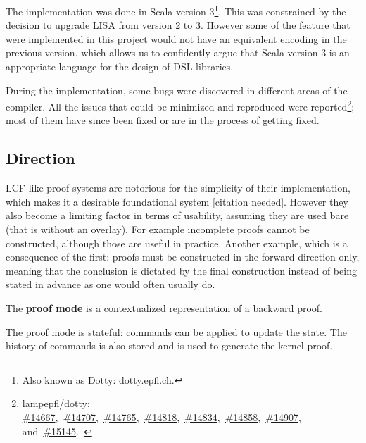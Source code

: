 The implementation was done in Scala version 3\footnote{Also known as Dotty: \href{https://dotty.epfl.ch}{dotty.epfl.ch}.}. This was constrained by the decision to upgrade LISA from version 2 to 3. However some of the feature that were implemented in this project would not have an equivalent encoding in the previous version, which allows us to confidently argue that Scala version 3 is an appropriate language for the design of DSL libraries.

During the implementation, some bugs were discovered in different areas of the compiler. All the issues that could be minimized and reproduced were reported\footnote{
lampepfl/dotty:
\href{https://github.com/lampepfl/dotty/issues/14667}{\#14667},\
\href{https://github.com/lampepfl/dotty/issues/14707}{\#14707},\
\href{https://github.com/lampepfl/dotty/issues/14765}{\#14765},\
\href{https://github.com/lampepfl/dotty/issues/14818}{\#14818},\
\href{https://github.com/lampepfl/dotty/issues/14834}{\#14834},\
\href{https://github.com/lampepfl/dotty/issues/14858}{\#14858},\
\href{https://github.com/lampepfl/dotty/issues/14907}{\#14907}, and\
\href{https://github.com/lampepfl/dotty/issues/15145}{\#15145}.\
}; most of them have since been fixed or are in the process of getting fixed.

\subsection{Direction}

LCF-like proof systems are notorious for the simplicity of their implementation, which makes it a desirable foundational system [citation needed]. However they also become a limiting factor in terms of usability, assuming they are used bare (that is without an overlay). For example incomplete proofs cannot be constructed, although those are useful in practice. Another example, which is a consequence of the first: proofs must be constructed in the forward direction only, meaning that the conclusion is dictated by the final construction instead of being stated in advance as one would often usually do.

\begin{definition}[Proof mode]
The \textbf{proof mode} is a contextualized representation of a backward proof.
\end{definition}

The proof mode is stateful: commands can be applied to update the state. The history of commands is also stored and is used to generate the kernel proof.

